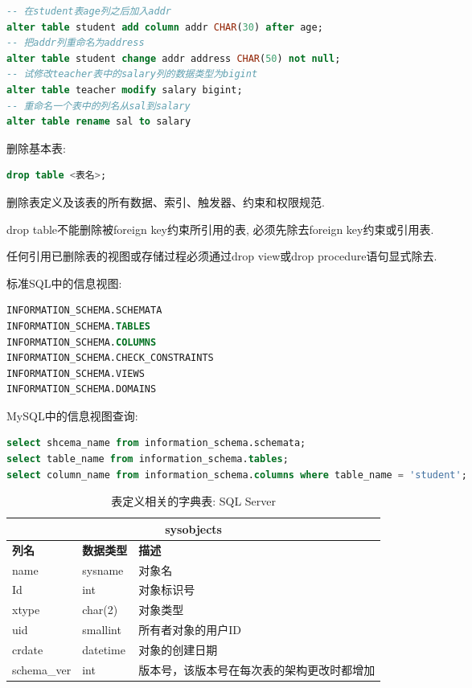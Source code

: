 \begin{lstlisting}[language=SQL]
-- 在student表age列之后加入addr
alter table student add column addr CHAR(30) after age;
-- 把addr列重命名为address
alter table student change addr address CHAR(50) not null;
-- 试修改teacher表中的salary列的数据类型为bigint
alter table teacher modify salary bigint;
-- 重命名一个表中的列名从sal到salary
alter table rename sal to salary
\end{lstlisting}

删除基本表:
\begin{lstlisting}[language=SQL]
drop table <表名>;
\end{lstlisting}
删除表定义及该表的所有数据、索引、触发器、约束和权限规范.

drop table不能删除被foreign key约束所引用的表, 必须先除去foreign key约束或引用表.

任何引用已删除表的视图或存储过程必须通过drop view或drop procedure语句显式除去.

标准SQL中的信息视图:
\begin{lstlisting}[language=SQL]
INFORMATION_SCHEMA.SCHEMATA
INFORMATION_SCHEMA.TABLES
INFORMATION_SCHEMA.COLUMNS
INFORMATION_SCHEMA.CHECK_CONSTRAINTS
INFORMATION_SCHEMA.VIEWS
INFORMATION_SCHEMA.DOMAINS
\end{lstlisting}

MySQL中的信息视图查询:
\begin{lstlisting}[language=SQL]
select shcema_name from information_schema.schemata;
select table_name from information_schema.tables;
select column_name from information_schema.columns where table_name = 'student';
\end{lstlisting}

\begin{table}[H]
\centering
\label{tab:sysobjects}
\begin{tabular}{|l|l|l|}
\hline
\multicolumn{3}{|c|}{sysobjects} \\ \hline
\textbf{列名} & \textbf{数据类型} & \textbf{描述} \\ \hline
name & sysname & 对象名 \\ \hline
Id & int & 对象标识号 \\ \hline
xtype & char(2) & 对象类型 \\ \hline
uid & smallint & 所有者对象的用户ID \\ \hline
crdate & datetime & 对象的创建日期 \\ \hline
schema\_ver & int & 版本号，该版本号在每次表的架构更改时都增加 \\ \hline
\end{tabular}
\caption{表定义相关的字典表: SQL Server}
\end{table}

